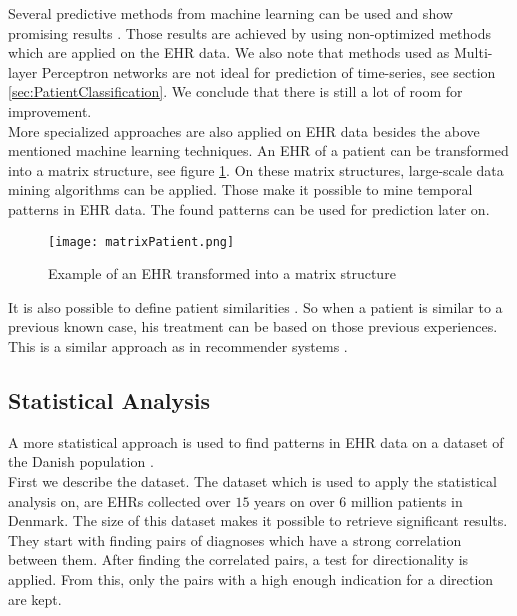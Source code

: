 Several predictive methods from machine learning can be used and show promising results \cite{EHRmining:article}. Those results are achieved by using non-optimized methods which are applied on the EHR data. We also note that methods used as Multi-layer Perceptron networks are not ideal for prediction of time-series, see section \ref{sec:PatientClassification}. We conclude that there is still a lot of room for improvement. \\
 
More specialized approaches are also applied on EHR data \cite{EHRrecommender:article} besides the above mentioned machine learning techniques. 
An EHR of a patient can be transformed into a matrix structure, see figure \ref{fig:matrixPatient}. On these matrix structures, large-scale data mining algorithms can be applied. Those make it possible to mine temporal patterns in EHR data. The found patterns can be used for prediction later on.

\begin{figure}[!htb]
	\centering
	\texttt{[image: matrixPatient.png]}
	\caption{Example of an EHR transformed into a matrix structure \cite{EHRrecommender:article}}
	\label{fig:matrixPatient}
\end{figure}

It is also possible to define patient similarities \cite{EHRsimilarity:article}. So when a patient is similar to a previous known case, his treatment can be based on those previous experiences. This is a similar approach as in recommender systems \cite{recommender:article}.


\subsection{Statistical Analysis}

A more statistical approach is used to find patterns in EHR data on a dataset of the Danish population \cite{Brunak:article}. \\

First we describe the dataset. The dataset which is used to apply the statistical analysis on, are EHRs collected over $15$ years on over $6$ million patients in Denmark. The size of this dataset makes it possible to retrieve significant results. \\

They start with finding pairs of diagnoses which have a strong correlation between them. After finding the correlated pairs, a test for directionality is applied. From this, only the pairs with a high enough indication for a direction are kept. \\

